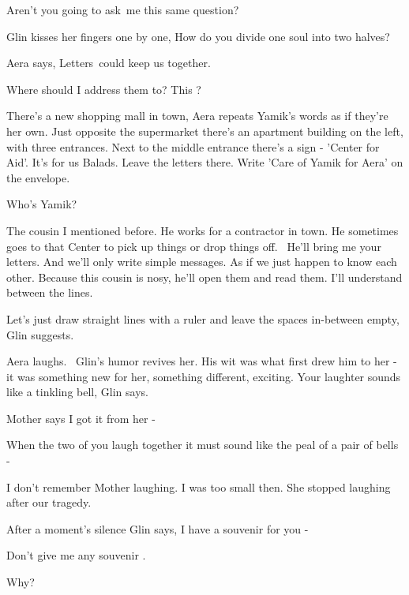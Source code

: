 \documentclass[letterpaper]{article}
\begin{document}
{\textquotedbl}Aren't you going to ask~me this same question?{\textquotedbl} 

Glin kisses her fingers one by one, {\textquotedbl}How do you divide one soul into two halves?{\textquotedbl}

Aera says, {\textquotedbl}Letters~could keep us together.{\textquotedbl} 

{\textquotedbl}Where should I address them to? This ?{\textquotedbl} 

{\textquotedbl}There's a new shopping mall in town,{\textquotedbl} Aera repeats Yamik's words as if they're her own.
{\textquotedbl}Just opposite the supermarket there's an apartment building on the left, with three entrances. Next to
the middle entrance there's a sign - {}'Center for Aid'. It's for us Balads. Leave the letters there. Write 'Care of
Yamik for Aera' on the envelope.{\textquotedbl} 

{\textquotedbl}Who's Yamik?{\textquotedbl} 

{\textquotedbl}The cousin I mentioned before. He works for a contractor in town. He sometimes goes to that Center to
pick up things or drop things off.~ He'll bring me your letters. And we'll only write simple messages. As if we just
happen to know each other. Because this cousin is nosy, he'll open them and read them. I'll understand between the
lines.{\textquotedbl} 

{\textquotedbl}Let's just draw straight lines with a ruler and leave the spaces in-between empty,{\textquotedbl} Glin
suggests. 

Aera laughs. ~Glin's humor revives her. His wit was what first drew him to her - it was something new for her, something
different, exciting. {\textquotedbl}Your laughter sounds like a tinkling bell,{\textquotedbl} Glin says.

{\textquotedbl}Mother says I got it from her -{\textquotedbl} 

{\textquotedbl}When the two of you laugh together it must sound like the peal of a pair of bells -{\textquotedbl} 

{\textquotedbl}I don't remember Mother laughing. I was too small then. She stopped laughing after our
tragedy.{\textquotedbl}

After a moment's silence Glin says, {\textquotedbl}I have a souvenir for you -{\textquotedbl} 

{\textquotedbl}Don't give me any souvenir .{\textquotedbl} 

{\textquotedbl}Why?{\textquotedbl} 
\end{document}
